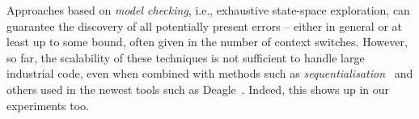 
\enlargethispage{6mm}

Approaches based on \emph{model checking}, i.e., exhaustive state-space
exploration, can guarantee the discovery of all potentially present errors --
either in general or at least up to some bound, often given in the number of
context switches. However, so far, the scalability of these techniques is not
sufficient to handle large industrial code, even when combined with methods such
as \emph{sequentialisation}~\cite{lal-reps-08,lazy-seq-16} and others used in
the newest tools such as Deagle~\cite{deagle}. Indeed, this shows up in our
experiments too.

\vspace*{-3mm}